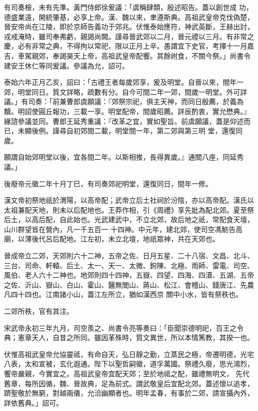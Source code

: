 \begin{pinyinscope}
 有司奏檢，未有先準。黃門侍郎徐爰議：「虞稱肆類，殷述昭告。蓋以創世成
 功，德盛業遠，開統肇基，必享上帝。漢、魏以來，聿遵斯典。高祖武皇帝克伐偽楚，晉安帝尚在江陵，即於京師告義功于郊兆。伏惟泰始應符，神武英斷，王赫出討，戎戒淹時，雖司奉弗虧，親謁尚闕。謹尋晉武郊以二月，晉元禋以三月。有非常之慶，必有非常之典，不得拘以常祀，限以正月上辛。愚謂宜下史官，考擇十一月嘉吉，車駕親郊，奉謁昊天上帝，高祖武皇帝配饗。其餘祔食，不關今祭。」尚書令建安王休仁等同爰議。參議為允，詔可。



 泰始六年正月乙亥，詔曰：「古禮王者每歲郊享，爰及明堂。自晉以來，間年一郊，明堂同日。質文詳略，疏數有分。自今可間二年一郊，間歲一明堂。外可詳議。」有司奏：「前兼曹郎虞願議：『郊祭宗祀，俱主天神，而同日殷薦，於義為黷。明詔使圓丘報功，三載一享。明堂配帝，間歲昭薦。詳辰酌衷，實允懋典。』緣諮參議並同。曹郎王延秀重議：『改革之宜，實如聖旨。前虞願議，蓋是仰述而已，未顯後例。謹尋自初郊間二載，明堂間一年，第二郊與第三明
 堂，還復同歲。



 願謂自始郊明堂以後，宜各間二年。以斯相推，長得異歲。』通關八座，同延秀議。」



 後廢帝元徽二年十月丁巳，有司奏郊祀明堂，還復同日，間年一修。



 漢文帝初祭地祇於渭陽，以高帝配；武帝立后土社祠於汾陰，亦以高帝配。漢氏以太祖兼配天地，則未以后配地也。王莽作相，引《周禮》享先妣為配北郊。夏至祭后土，以高后配，自此始也。光武建武中，不立北郊，故后地之祇，常配食天壇，山川群望皆在營內，凡一千五百一
 十四神。中元年，建北郊，使司空馮魴告高廟，以薄後代呂后配地。江左初，未立北壇，地祇眾神，共在天郊也。



 晉成帝立二郊，天郊則六十二神，五帝之佐、日月五星、二十八宿、文昌、北斗、三台、司命、軒轅、后土、太一、天一、太微、鉤陳、北極、雨師、雷電、司空、風伯、老人六十二神也。地郊則四十四神，五嶽、四望、四海、四瀆、五湖、五帝之佐、沂山、嶽山、白山、霍山、醫無閭山、蔣山、松江、會稽山、錢唐江、先農凡四十四也。江南諸小山，蓋江左所立，猶如漢西京
 關中小水，皆有祭秩也。



 二郊所秩，官有其注。



 宋武帝永初三年九月，司空羨之、尚書令亮等奏曰：「臣聞崇德明祀，百王之令典；憲章天人，自昔之所同。雖因革殊時，質文異世，所以本情篤教，其揆一也。



 伏惟高祖武皇帝允協靈祗，有命自天，弘日靜之勤，立蒸民之極，帝遷明德，光宅八表，太和宣被，玄化遐通。陛下以聖哲嗣徽，道孚萬國。祭禮久廢，思光鴻烈，饗帝嚴親，今實宜之。高祖武皇帝宜配天郊；至於地祗之配，雖禮無明文，
 先代舊章，每所因循，魏、晉故典，足為前式。謂武敬皇后宜配北郊。蓋述懷以追孝，躋聖敬於無窮，對越兩儀，允洽幽顯者也。明年孟春，有事於二郊，請宣攝內外，詳依舊典。」詔可。




\end{pinyinscope}
